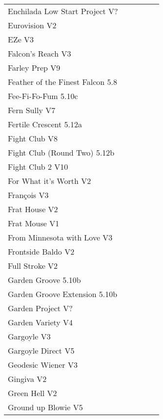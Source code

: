 \begin{flushleft}
\begin{center}
\begin{supertabular}{p{0.76\linewidth}p{0.08\linewidth}}
Enchilada Low Start Project V? & \pageref{vr:Enchilada Low Start Project} \\
Eurovision V2 & \pageref{rt:Eurovision} \\
EZe V3 & \pageref{vr:EZe} \\
Falcon's Reach V3 & \pageref{rt:Falcon's Reach} \\
Farley Prep V9 & \pageref{rt:Farley Prep} \\
Feather of the Finest Falcon 5.8 & \pageref{rt:Feather of the Finest Falcon} \\
Fee-Fi-Fo-Fum 5.10c & \pageref{rt:Fee-Fi-Fo-Fum} \\
Fern Sully V7 & \pageref{rt:Fern Sully} \\
Fertile Crescent 5.12a & \pageref{rt:Fertile Crescent} \\
Fight Club V8 & \pageref{rt:Fight Club} \\
Fight Club (Round Two) 5.12b & \pageref{rt:Fight Club (Round Two)} \\
Fight Club 2 V10 & \pageref{rt:Fight Club 2} \\
For What it's Worth V2 & \pageref{rt:For What it's Worth} \\
François V3 & \pageref{rt:François} \\
Frat House V2 & \pageref{rt:Frat House} \\
Frat Mouse V1 & \pageref{rt:Frat Mouse} \\
From Minnesota with Love V3 & \pageref{rt:From Minnesota with Love} \\
Frontside Baldo V2 & \pageref{rt:Frontside Baldo} \\
Full Stroke V2 & \pageref{rt:Full Stroke} \\
Garden Groove 5.10b & \pageref{rt:Garden Groove} \\
Garden Groove Extension 5.10b & \pageref{vr:Garden Groove Extension} \\
Garden Project V? & \pageref{rt:Garden Project} \\
Garden Variety V4 & \pageref{rt:Garden Variety} \\
Gargoyle V3 & \pageref{rt:Gargoyle} \\
Gargoyle Direct V5 & \pageref{vr:Gargoyle Direct} \\
Geodesic Wiener V3 & \pageref{rt:Geodesic Wiener} \\
Gingiva V2 & \pageref{rt:Gingiva} \\
Green Hell V2 & \pageref{rt:Green Hell} \\
Ground up Blowie V5 & \pageref{rt:Ground up Blowie} \\

\end{supertabular}
\end{center}
\end{flushleft}
